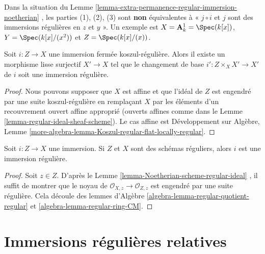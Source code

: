 \begin{remark}
\label{remark-not-always-extra-permanence}
Dans la situation du Lemme  \ref{lemma-extra-permanence-regular-immersion-noetherian} , les parties (1), (2), (3) sont
 {\bf  non }  équivalentes à « $j \circ i$  et
 $j$  sont des immersions régulières en  $z$  et  $y$ ». Un
exemple est  $X = \mathbf{A}^1_k = \Spec(k[x])$,  $Y = \Spec(k[x]/(x^2))$  et  $Z = \Spec(k[x]/(x))$.
\end{remark}

\begin{lemma}
\label{lemma-koszul-regular-smooth-locally-regular}
Soit  $i : Z \to X$  une immersion fermée koszul-régulière. Alors il existe un
morphisme lisse surjectif  $X' \to X$  tel que le changement de base  $i' : Z \times_X X' \to X'$ 
de  $i$  soit une immersion régulière.
\end{lemma}

\begin{proof}
Nous pouvons supposer que  $X$  est affine et que l'idéal de  $Z$ 
est engendré par une suite koszul-régulière en remplaçant  $X$  par les
éléments d'un recouvrement ouvert affine approprié (ouverts affines comme dans le
Lemme  \ref{lemma-regular-ideal-sheaf-scheme}). Le cas affine est Développement sur Algèbre, Lemme
 \ref{more-algebra-lemma-Koszul-regular-flat-locally-regular}.
\end{proof}

\begin{lemma}
\label{lemma-immersion-regular-regular-immersion}
Soit  $i : Z \to X$  une immersion. Si  $Z$  et  $X$  sont des schémas
réguliers, alors  $i$  est une immersion régulière.
\end{lemma}

\begin{proof}
Soit  $z \in Z$. D'après le Lemme  \ref{lemma-Noetherian-scheme-regular-ideal} , il suffit de montrer que le
noyau de  $\mathcal{O}_{X, z} \to \mathcal{O}_{Z, z}$  est engendré par une suite régulière. Cela découle des lemmes
d'Algèbre  \ref{algebra-lemma-regular-quotient-regular}  et  \ref{algebra-lemma-regular-ring-CM}.
\end{proof}





\section{Immersions régulières relatives}
\label{section-relative-regular-immersion}

